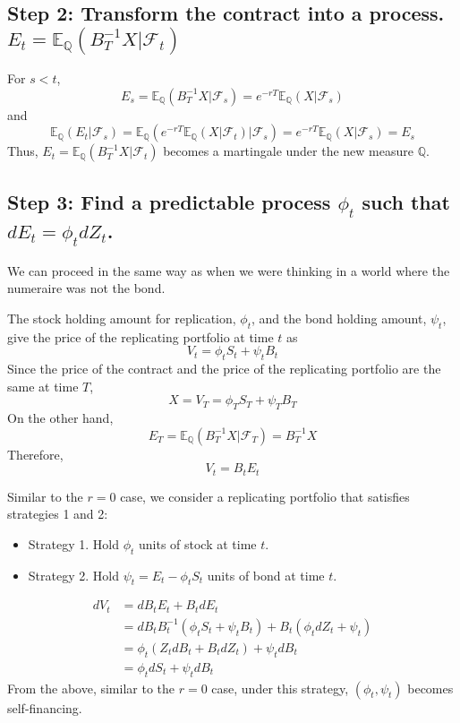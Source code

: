 \documentclass[uplatex,a4j,12pt,dvipdfmx]{jsarticle}
\begin{document}
\subsection{Step 2: Transform the contract into a process. $E_{t} = \mathbb{E}_{\mathbb{Q}}(B^{-1}_{T} X | \mathcal{F}_{t})$}
For $s<t$,
$$ E_{s} = \mathbb{E}_{\mathbb{Q}}(B^{-1}_{T} X | \mathcal{F}_{s}) = e^{-rT} \mathbb{E}_{\mathbb{Q}}( X | \mathcal{F}_{s}) $$
and
$$ \mathbb{E}_{\mathbb{Q}}( E_{t} | \mathcal{F}_{s}) = \mathbb{E}_{\mathbb{Q}} \left( e^{-rT} \mathbb{E}_{\mathbb{Q}}( X | \mathcal{F}_{t}) \Big| \mathcal{F}_{s} \right) = e^{-rT} \mathbb{E}_{\mathbb{Q}}( X | \mathcal{F}_{s}) = E_{s} $$
Thus, $E_{t} = \mathbb{E}_{\mathbb{Q}}(B^{-1}_{T} X | \mathcal{F}_{t})$ becomes a martingale under the new measure $\mathbb{Q}$.

\subsection{Step 3: Find a predictable process $\phi_{t}$ such that $dE_{t} = \phi_{t} d Z_{t}$.}
We can proceed in the same way as when we were thinking in a world where the numeraire was not the bond.

The stock holding amount for replication, $\phi_{t}$, and the bond holding amount, $\psi_{t}$, give the price of the replicating portfolio at time $t$ as
$$V_{t} = \phi_{t} S_{t} + \psi_{t} B_{t}$$
Since the price of the contract and the price of the replicating portfolio are the same at time $T$,
$$X = V_{T} = \phi_{T} S_{T} + \psi_{T} B_{T}$$
On the other hand,
$$E_{T} = \mathbb{E}_{\mathbb{Q}}(B^{-1}_{T} X | \mathcal{F}_{T}) = B^{-1}_{T} X$$
Therefore,
$$V_{t} = B_{t} E_{t}$$

Similar to the $r=0$ case, we consider a replicating portfolio that satisfies strategies 1 and 2:
\begin{itemize}
	\item Strategy 1. Hold $\phi_{t}$ units of stock at time $t$.
	\item Strategy 2. Hold $\psi_{t} = E_{t} - \phi_{t} S_{t}$ units of bond at time $t$.
\end{itemize}
\begin{align*}
	d V_{t} & = d B_{t} E_{t} + B_{t} d E_{t} \\
	& = d B_{t} B^{-1}_{t} (\phi_{t} S_{t} + \psi_{t} B_{t}) + B_{t} (\phi_{t} dZ_{t} + \psi_{t}) \\
	& = \phi_{t} (Z_{t} dB_{t} + B_{t} dZ_{t}) + \psi_{t} dB_{t} \\
	& = \phi_{t} dS_{t} + \psi_{t} dB_{t}
\end{align*}
From the above, similar to the $r=0$ case, under this strategy, $(\phi_{t},\psi_{t})$ becomes self-financing.
\end{document}
